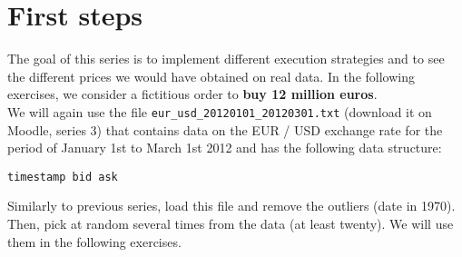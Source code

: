\section*{First steps}

The goal of this series is to implement different execution strategies and to see the different prices we would have obtained on real data. In the following exercises, we consider a fictitious order to \textbf{buy 12 million euros}. \\

\noindent We will again use the file \texttt{eur\_usd\_20120101\_20120301.txt} (download it on Moodle, series 3) that contains data on the EUR / USD exchange rate for the period of January 1st to March 1st 2012 and has the following data structure: \\

\begin{verbatim}
timestamp bid ask
\end{verbatim}

\noindent Similarly to previous series, load this file and remove the outliers (date in 1970). \\

\noindent Then, pick at random several times from the data (at least twenty). We will use them in the following exercises. \\
